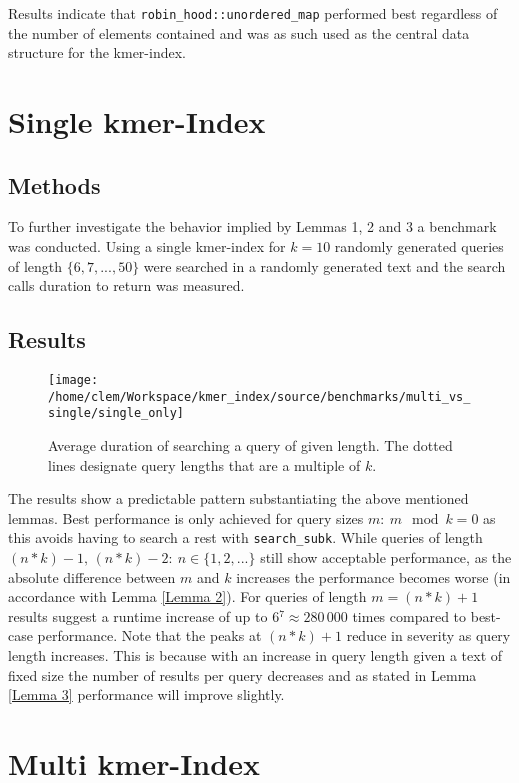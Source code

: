 Results indicate that \lstinline{robin_hood::unordered_map} performed
best regardless of the number of elements contained and was as such
used as the central data structure for the kmer-index.

\section{Single kmer-Index}
\subsection{Methods}
To further investigate the behavior implied by Lemmas 1, 2 and 3 a benchmark was conducted.
Using a single kmer-index for $k=10$ randomly generated queries of length $\{6,7,...,50\}$ were searched in a
randomly generated text and the search calls duration to return was measured.

\subsection{Results}
\begin{figure}[H]
\texttt{[image: /home/clem/Workspace/kmer\_index/source/benchmarks/multi\_vs\_single/single\_only]}

\caption{\label{figure 1} Average duration of searching a query of given length.
The dotted lines designate query lengths that are a multiple of $k$.}
\end{figure}

The results show a predictable pattern substantiating the above mentioned
lemmas. Best performance is only achieved for query sizes $m:\:m\mod k=0$
as this avoids having to search a rest with \lstinline{search_subk}.
While queries of length $(n*k)-1,\,(n*k)-2:\:n\in\{1,2,...\}$ still
show acceptable performance, as the absolute difference between $m$
and $k$ increases the performance becomes worse (in accordance with
Lemma \ref{Lemma 2}). For queries of length $m=(n*k)+1$ results suggest
a runtime increase of up to $6{{}^7}\approx280\,000$ times compared
to best-case performance. Note that the peaks at $(n*k)+1$ reduce
in severity as query length increases. This is because with an increase
in query length given a text of fixed size the number of results per
query decreases and as stated in Lemma \ref{Lemma 3} performance will
improve slightly.

\section{Multi kmer-Index}
